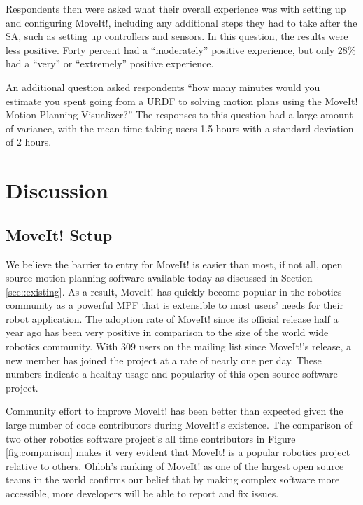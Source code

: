 \documentclass[10pt,journal,compsoc]{joser1}
\begin{document}
{Respondents then were asked what their overall experience was with setting up
and configuring MoveIt!, including any additional steps they had to take after
the SA, such as setting up controllers and sensors. In this question, the
results were less positive. Forty percent had a ``moderately'' positive
experience, but only 28\% had a ``very'' or ``extremely'' positive experience. 

An additional question asked respondents ``how many minutes would you estimate
you spent going from a URDF to solving motion plans using the MoveIt! Motion
Planning Visualizer?'' The responses to this question had a large amount of
variance, with the mean time taking users 1.5 hours with a standard deviation of
2 hours.



\section{Discussion}
\label{sec::discussion}

\subsection{MoveIt! Setup}
\label{sec::moveit_discussion}

We believe the barrier to entry for MoveIt! is easier than most, if not all,
open source motion planning software available today as discussed in Section
\ref{sec::existing}. As a result, MoveIt! has quickly become popular in the
robotics community as a powerful MPF that is extensible to most users' needs for
their robot application. The adoption rate of MoveIt! since its official release
half a year ago has been very positive in comparison to the size of the world
wide robotics community. With 309 users on the mailing list since MoveIt!'s
release, a new member has joined the project at a rate of nearly one per day.
These numbers indicate a healthy usage and popularity of this open source
software project.

Community effort to improve MoveIt! has been better than expected given the large number of code contributors during MoveIt!'s existence. The comparison of two other robotics software project's all time contributors in Figure \ref{fig:comparison} makes it very evident that MoveIt! is a popular robotics project relative to others. Ohloh's ranking of MoveIt! as one of the largest open source teams in the world confirms our belief that by making complex software more accessible, more developers will be able to report and fix issues. 

}
\end{document}
